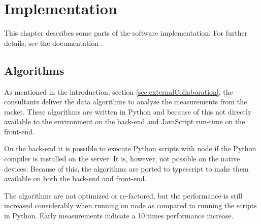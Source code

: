 \chapter{Implementation}
This chapter describes some parts of the software implementation.
For further details, see the documentation .

\section{Algorithms}
As mentioned in the introduction, section \ref{sec:externalCollaboration}, the consultants deliver the data algorithms to analyse the measurements from the racket.
These algorithms are written in Python and because of this not directly available to the  environment on the back-end and JavaScript run-time on the front-end.

On the back-end it is possible to execute Python scripts with \gls{node} if the Python compiler is installed on the server.
It is, however, not possible on the native devices.
Because of this, the algorithms are ported to \gls{typescript} to make them available on both the back-end and front-end.

The algorithms are not optimized or re-factored, but the performance is still increased considerably when running on \gls{node} as compared to running the scripts in Python.
Early measurements indicate a 10 times performance increase.
